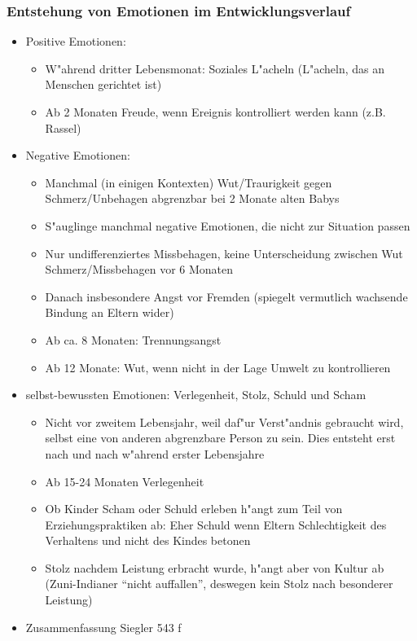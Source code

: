 \subsubsection{Entstehung von Emotionen im Entwicklungsverlauf}
\begin{itemize}
	\item
		Positive Emotionen:
		\begin{itemize}
			\item
				W"ahrend dritter Lebensmonat: Soziales L"acheln (L"acheln, das an Menschen gerichtet ist)
			\item
				Ab 2 Monaten Freude, wenn Ereignis kontrolliert werden kann (z.B. Rassel)
		\end{itemize}
	\item
		Negative Emotionen:
		\begin{itemize}
			\item
				Manchmal (in einigen Kontexten) Wut/Traurigkeit gegen Schmerz/Unbehagen abgrenzbar bei 2 Monate alten Babys
			\item
				S"auglinge manchmal negative Emotionen, die nicht zur Situation passen
			\item
				Nur undifferenziertes Missbehagen, keine Unterscheidung zwischen Wut Schmerz/Missbehagen vor 6 Monaten
			\item
				Danach insbesondere Angst vor Fremden (spiegelt vermutlich wachsende Bindung an Eltern wider)
			\item
				Ab ca. 8 Monaten: Trennungsangst
			\item
			 Ab 12 Monate: Wut, wenn nicht in der Lage Umwelt zu kontrollieren
		\end{itemize}
	\item
		selbst-bewussten Emotionen: Verlegenheit, Stolz, Schuld und Scham
		\begin{itemize}
			\item
				Nicht vor zweitem Lebensjahr, weil daf"ur Verst"andnis gebraucht wird, selbst eine von anderen abgrenzbare Person zu sein. Dies entsteht erst nach und nach w"ahrend erster Lebensjahre
			\item
				Ab 15-24 Monaten Verlegenheit
			\item
				Ob Kinder Scham oder Schuld erleben h"angt zum Teil von Erziehungspraktiken ab: Eher Schuld wenn Eltern Schlechtigkeit des Verhaltens und nicht des Kindes betonen
			\item
				Stolz nachdem Leistung erbracht wurde, h"angt aber von Kultur ab (Zuni-Indianer \enquote{nicht auffallen}, deswegen kein Stolz nach besonderer Leistung)
		\end{itemize}

	\item
		Zusammenfassung Siegler 543 f
\end{itemize}

